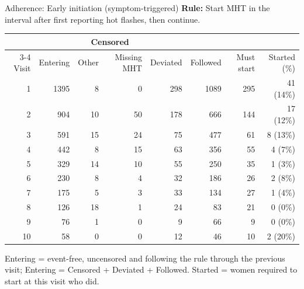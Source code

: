 \begin{frame}{Adherence: Early initiation (symptom-triggered)}
\centering
{\small \textbf{Rule:} Start MHT in the interval after first reporting hot flashes, then continue.}\par\vspace{6pt}
{\scriptsize
\begin{tabular}{r r r r r r r r}
\toprule
 & & \multicolumn{2}{c}{Censored} & & & & \\
\cmidrule(lr){3-4}
Visit & Entering & Other & Missing MHT & Deviated & Followed & Must start & Started (\%) \\
\midrule
1 & 1395 & 8 & 0 & 298 & 1089 & 295 & 41 (14\%) \\
2 & 904 & 10 & 50 & 178 & 666 & 144 & 17 (12\%) \\
3 & 591 & 15 & 24 & 75 & 477 & 61 & 8 (13\%) \\
4 & 442 & 8 & 15 & 63 & 356 & 55 & 4 (7\%) \\
5 & 329 & 14 & 10 & 55 & 250 & 35 & 1 (3\%) \\
6 & 230 & 8 & 4 & 32 & 186 & 26 & 2 (8\%) \\
7 & 175 & 5 & 3 & 33 & 134 & 27 & 1 (4\%) \\
8 & 126 & 18 & 1 & 24 & 83 & 21 & 0 (0\%) \\
9 & 76 & 1 & 0 & 9 & 66 & 9 & 0 (0\%) \\
10 & 58 & 0 & 0 & 12 & 46 & 10 & 2 (20\%) \\
\bottomrule
\end{tabular}}
\par\vspace{6pt}
{\tiny Entering = event-free, uncensored and following the rule through the previous visit; Entering = Censored + Deviated + Followed. Started = women required to start at this visit who did.}
\end{frame}

